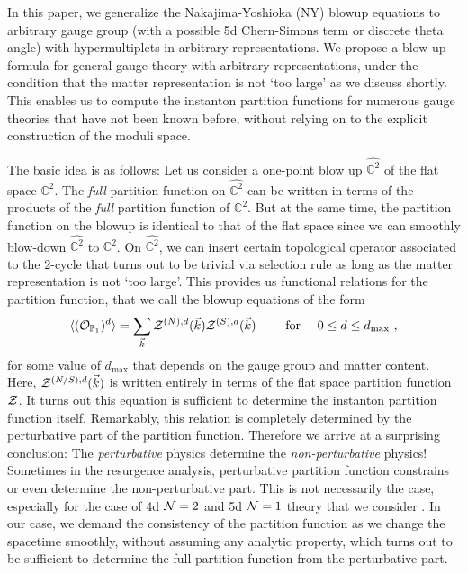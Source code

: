 \documentclass[letterpaper, 11pt]{article}
\def\IC{\mathbb{C}}
\def\IP{\mathbb{P}}
\def\CN{{\cal N}}
\def\CO{{\cal O}}
\def\CZ{{\cal Z}}
\begin{document}
In this paper, we generalize the Nakajima-Yoshioka (NY) blowup equations \cite{Nakajima:2003pg,Nakajima:2003uh,Nakajima:2005fg, Gottsche:2006bm, Nakajima:2009qjc, Gottsche:2010ig} to arbitrary gauge group (with a possible 5d Chern-Simons term or discrete theta angle) with hypermultiplets in arbitrary representations. We propose a blow-up formula for general gauge theory with arbitrary representations, under the condition that the matter representation is not `too large' as we discuss shortly. This enables us to compute the instanton partition functions for numerous gauge theories that have not been known before, without relying on to the explicit construction of the moduli space. 

The basic idea is as follows: Let us consider a one-point blow up $\hat{\IC^2}$ of the flat space $\IC^2$. The \emph{full} partition function on $\hat{\IC^2}$ can be written in terms of the products of the \emph{full} partition function of $\IC^2$. But at the same time, the partition function on the blowup is identical to that of the flat space since we can smoothly blow-down $\hat{\IC^2}$ to $\IC^2$. On $\hat{\IC^2}$, we can insert certain topological operator associated to the 2-cycle that turns out to be trivial via selection rule as long as the matter representation is not `too large'. This provides us functional relations for the partition function, that we call the blowup equations of the form
\begin{align}
 \langle (\CO_{\IP_1})^d \rangle = \sum_{\vec{k}} \CZ^{(N), d}(\vec{k}) \CZ^{(S), d}(\vec{k}) \qquad \textrm{ for }\quad 0 \le d \le d_{\text{max}} \ , 
\end{align}
for some value of $d_\text{max}$ that depends on the gauge group and matter content. Here, $\CZ^{(N/S), d} (\vec{k})$ is written entirely in terms of the flat space partition function $\CZ$. 
It turns out this equation is sufficient to determine the instanton partition function itself. Remarkably, this relation is completely determined by the perturbative part of the partition function. Therefore we arrive at a surprising conclusion: The \emph{perturbative} physics determine the \emph{non-perturbative} physics! Sometimes in the resurgence analysis, perturbative partition function constrains or even determine the non-perturbative part. This is not necessarily the case, especially for the case of 4d $\CN=2$ and 5d $\CN=1$ theory that we consider \cite{Honda:2016mvg}. In our case, we demand the consistency of the partition function as we change the spacetime smoothly, without assuming any analytic property, which turns out to be sufficient to determine the full partition function from the perturbative part. 
\end{document}
